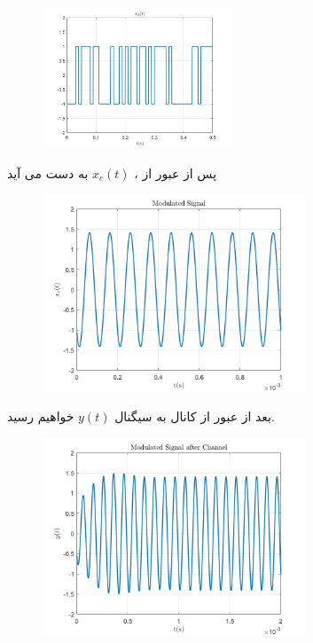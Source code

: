 \documentclass[a4paper]{article}
\begin{document}
\begin{figure}[h!]
	\includegraphics[width=0.5\textwidth]{comsys_fig06.png}\\ 
	\centering
\end{figure}
\newline
پس از عبور از  ، 
$x_c(t)$
به دست می آید
\newline
\begin{figure}[h!]
	\includegraphics[width=0.7\textwidth]{comsys_fig07.png}\\ 
	\centering
\end{figure}
\newline
	بعد از عبور از کانال به سیگنال 
	$y(t)$
	خواهیم رسید.
	\newline
	\begin{figure}[h!]
		\includegraphics[width=0.7\textwidth]{comsys_fig08.png}\\ 
		\centering
	\end{figure}
\end{document}
